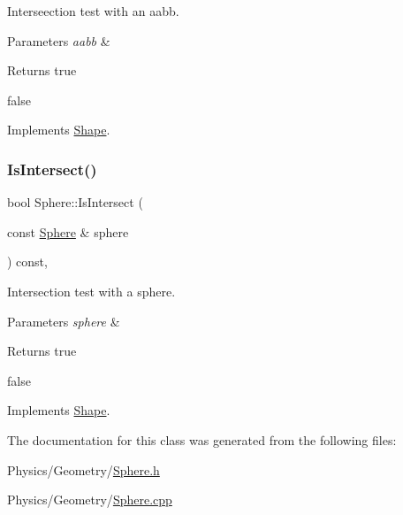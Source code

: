Interseection test with an aabb. 


\begin{DoxyParams}{Parameters}
{\em aabb} & \\
\hline
\end{DoxyParams}
\begin{DoxyReturn}{Returns}
true 

false 
\end{DoxyReturn}


Implements \hyperlink{classShape_a1bfc3d6c995c4326d4691b22d16d2f12}{Shape}.

\mbox{\label{classSphere_aa97baa4e07d8b042f99150df0757d623}} 
\subsubsection{\texorpdfstring{Is\+Intersect()}{IsIntersect()}\hspace{0.1cm}{\footnotesize\ttfamily [2/2]}}
{\footnotesize\ttfamily bool Sphere\+::\+Is\+Intersect (\begin{DoxyParamCaption}\item[{const \hyperlink{classSphere}{Sphere} \&}]{sphere }\end{DoxyParamCaption}) const\hspace{0.3cm}{\ttfamily [override]}, {\ttfamily [virtual]}}



Intersection test with a sphere. 


\begin{DoxyParams}{Parameters}
{\em sphere} & \\
\hline
\end{DoxyParams}
\begin{DoxyReturn}{Returns}
true 

false 
\end{DoxyReturn}


Implements \hyperlink{classShape_a1c942dca54e0d81f685624f33f2ce6c8}{Shape}.



The documentation for this class was generated from the following files\+:\begin{DoxyCompactItemize}
\item 
Physics/\+Geometry/\hyperlink{Sphere_8h}{Sphere.\+h}\item 
Physics/\+Geometry/\hyperlink{Sphere_8cpp}{Sphere.\+cpp}\end{DoxyCompactItemize}
